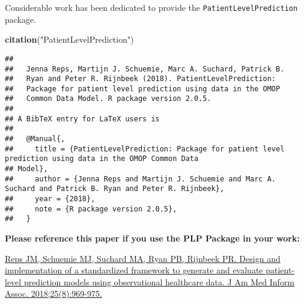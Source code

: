 \documentclass[]{article}
\newenvironment{Shaded}{\begin{snugshade}}{\end{snugshade}}
\newcommand{\KeywordTok}[1]{\textcolor[rgb]{0.13,0.29,0.53}{\textbf{#1}}}
\newcommand{\StringTok}[1]{\textcolor[rgb]{0.31,0.60,0.02}{#1}}
\newcommand{\NormalTok}[1]{#1}
\begin{document}
Considerable work has been dedicated to provide the
\texttt{PatientLevelPrediction} package.

\begin{Shaded}
\begin{Highlighting}[]
\KeywordTok{citation}\NormalTok{(}\StringTok{"PatientLevelPrediction"}\NormalTok{)}
\end{Highlighting}
\end{Shaded}

\begin{verbatim}
## 
##   Jenna Reps, Martijn J. Schuemie, Marc A. Suchard, Patrick B.
##   Ryan and Peter R. Rijnbeek (2018). PatientLevelPrediction:
##   Package for patient level prediction using data in the OMOP
##   Common Data Model. R package version 2.0.5.
## 
## A BibTeX entry for LaTeX users is
## 
##   @Manual{,
##     title = {PatientLevelPrediction: Package for patient level prediction using data in the OMOP Common Data
## Model},
##     author = {Jenna Reps and Martijn J. Schuemie and Marc A. Suchard and Patrick B. Ryan and Peter R. Rijnbeek},
##     year = {2018},
##     note = {R package version 2.0.5},
##   }
\end{verbatim}

\textbf{Please reference this paper if you use the PLP Package in your
work:}

\href{http://dx.doi.org/10.1093/jamia/ocy032}{Reps JM, Schuemie MJ,
Suchard MA, Ryan PB, Rijnbeek PR. Design and implementation of a
standardized framework to generate and evaluate patient-level prediction
models using observational healthcare data. J Am Med Inform Assoc.
2018;25(8):969-975.}
\end{document}
